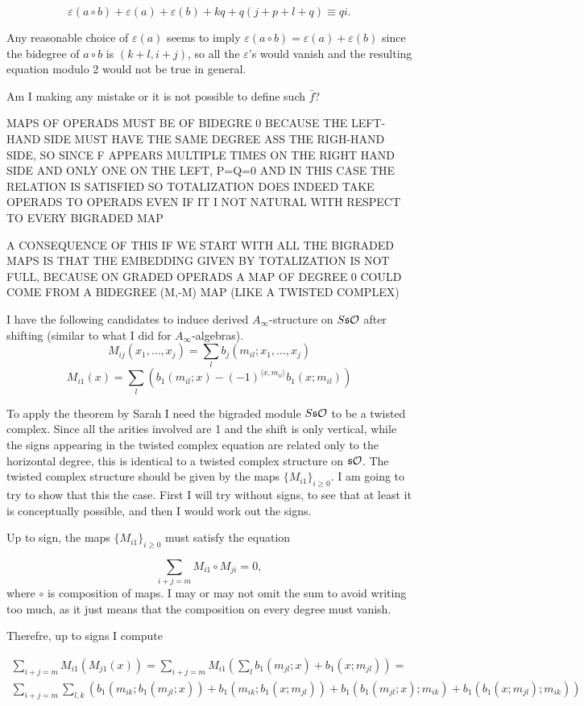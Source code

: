\documentclass[twoside]{article}
\begin{document}
$$\varepsilon(a\circ b)+\varepsilon(a)+\varepsilon(b)+kq+q(j+p+l+q)\equiv qi.$$

Any reasonable choice of $\varepsilon(a)$ seems to imply $\varepsilon(a\circ b)=\varepsilon(a)+\varepsilon(b)$ since the bidegree of $a\circ b$ is $(k+l,i+j)$, so all the $\varepsilon$'s would vanish and the resulting equation modulo 2 would not be true in general.

Am I making any mistake or it is not possible to define such $\bar{f}$?

MAPS OF OPERADS MUST BE OF BIDEGRE 0 BECAUSE THE LEFT-HAND SIDE MUST HAVE THE SAME DEGREE ASS THE RIGH-HAND SIDE, SO SINCE F APPEARS MULTIPLE TIMES ON THE RIGHT HAND SIDE AND ONLY ONE ON THE LEFT, P=Q=0 AND IN THIS CASE THE RELATION IS SATISFIED SO TOTALIZATION DOES INDEED TAKE OPERADS TO OPERADS EVEN IF IT I NOT NATURAL WITH RESPECT TO EVERY BIGRADED MAP

A CONSEQUENCE OF THIS IF WE START WITH ALL THE BIGRADED MAPS IS THAT THE EMBEDDING GIVEN BY TOTALIZATION IS NOT FULL, BECAUSE ON GRADED OPERADS A MAP OF DEGREE 0 COULD COME FROM A BIDEGREE (M,-M) MAP (LIKE A TWISTED COMPLEX)

\newpage
I have the following candidates to induce derived $A_\infty$-structure on $S\mathfrak{s}{\mathcal O}$ after shifting (similar to what I did for $A_\infty$-algebras). 
\[M_{ij}(x_1,\dots, x_j)=\sum_l b_j(m_{il};x_1,\dots, x_j)\]
\[M_{i1}(x)= \sum_l (b_1(m_{il};x)-(-1)^{\langle x,m_{il}\rangle}b_1(x;m_{il}))\]

To apply the theorem by Sarah I need the bigraded module $S\mathfrak{s}{\mathcal O}$ to be a twisted complex. Since all the arities involved are 1 and the shift is only vertical, while the signs appearing in the twisted complex equation are related only to the horizontal degree, this is identical to a twisted complex structure on $\mathfrak{s}{\mathcal O}$. The twisted complex structure should be given by the maps $\{M_{i1}\}_{i\geq 0}$. I am going to try to show that this the case. First I will try without signs, to see that at least it is conceptually possible, and  then I would work out the signs.

Up to sign, the maps  $\{M_{i1}\}_{i\geq 0}$ must satisfy the equation

\[\sum_{i+j=m} M_{i1}\circ M_{ji}=0,\]
where $\circ$ is composition of maps. I may or may not omit the sum to avoid writing too much, as it just means that the composition on every degree must vanish.

Therefre, up to signs I compute 

\begin{align*}
\sum_{i+j=m}M_{i1}(M_{j1}(x))=\sum_{i+j=m}M_{i1}\left(\sum_l b_1(m_{jl};x)+b_1(x;m_{jl})\right)=\\
\sum_{i+j=m}\sum_{l,k}\left(b_1(m_{ik}; b_1(m_{jl};x))+b_1(m_{ik};b_1(x;m_{jl}))+b_1(b_1(m_{jl};x);m_{ik})+b_1(b_1(x;m_{jl});m_{ik})\right)
\end{align*}
\end{document}
